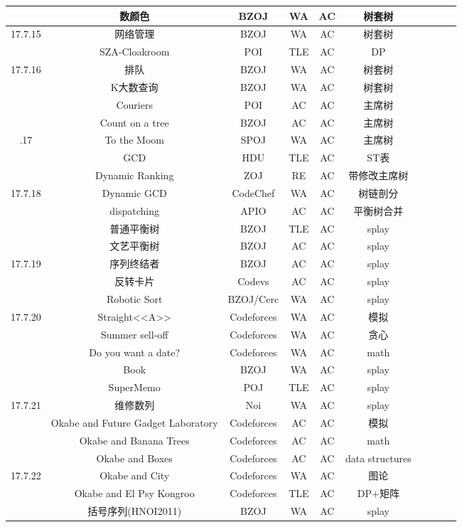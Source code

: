 \documentclass[landscape]{article}
\begin{document}
\begin{longtable}{cccccccccc}
  & 数颜色 & BZOJ & WA & AC & 树套树\\
  \hline
  17.7.15 & 网络管理 & BZOJ & WA & AC & 树套树\\
  & SZA-Cloakroom & POI & TLE & AC & DP\\
  \hline
  17.7.16 & 排队 & BZOJ & WA & AC & 树套树\\
  & K大数查询 & BZOJ & WA & AC & 树套树\\
  & Couriers & POI & AC & AC & 主席树\\
  & Count on a tree & BZOJ & AC & AC & 主席树\\
  \newpage
  \hline
  17.7.17 & To the Moom & SPOJ & WA & AC & 主席树\\
  & GCD & HDU & TLE & AC & ST表\\
  & Dynamic Ranking & ZOJ& RE & AC & 带修改主席树\\
  \hline
  17.7.18 & Dynamic GCD & CodeChef & WA & AC & 树链剖分\\
  & dispatching & APIO & AC & AC & 平衡树合并\\
  & 普通平衡树 & BZOJ & TLE & AC & splay\\
  & 文艺平衡树 & BZOJ & AC & AC & splay\\
  \hline
  17.7.19 & 序列终结者 & BZOJ & AC & AC & splay\\
  & 反转卡片 & Codevs & AC & AC & splay\\
  & Robotic Sort & BZOJ/Cerc & WA & AC & splay\\
  \hline
  17.7.20 & Straight<<A>> & Codeforces & WA & AC & 模拟\\
  & Summer sell-off & Codeforces & WA & AC & 贪心\\
  & Do you want a date? & Codeforces & WA & AC & math\\
  & Book & BZOJ & WA & AC & splay\\
  & SuperMemo & POJ & TLE & AC & splay\\
  \hline
  17.7.21 & 维修数列 & Noi & WA & AC & splay\\
  & Okabe and Future Gadget Laboratory & Codeforces & AC & AC & 模拟\\
  & Okabe and Banana Trees & Codeforces & AC & AC & math\\
  & Okabe and Boxes & Codeforces & AC & AC & data structures \\
  \hline
  17.7.22 & Okabe and City & Codeforces & WA & AC & 图论\\
  & Okabe and El Psy Kongroo & Codeforces & TLE & AC & DP$+$矩阵\\
  & 括号序列(HNOI2011) & BZOJ & WA & AC & splay\\

\end{longtable}
\end{document}
